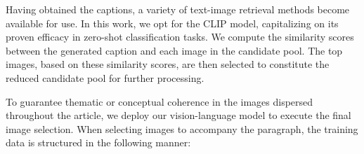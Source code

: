 \documentclass[10pt,twocolumn,letterpaper]{article}
\begin{document}
\begin{table*}[!t]
\small
\centering
{}
\caption{
\textbf{Evaluation of CCBench test set}. Here we report all the sub-tasks, including Calligraphy Painting(CP), Cultural Relic(CR), Food \& Clothes(F\&C), Historical Figures(H\&F), Scenery \& Building(S\&B), Sketch Reasoning(SR), Traditional Show(TS), 
}
\label{table:chinese_bench_results}
\end{table*}

Having obtained the captions, a variety of text-image retrieval methods become available for use. In this work, we opt for the CLIP model, capitalizing on its proven efficacy in zero-shot classification tasks. We compute the similarity scores between the generated caption and each image in the candidate pool. The top  images, based on these similarity scores, are then selected to constitute the reduced candidate pool for further processing.

To guarantee thematic or conceptual coherence in the images dispersed throughout the article, we deploy our vision-language model to execute the final image selection. When selecting images to accompany the  paragraph, the training data is structured in the following manner:
\end{document}

